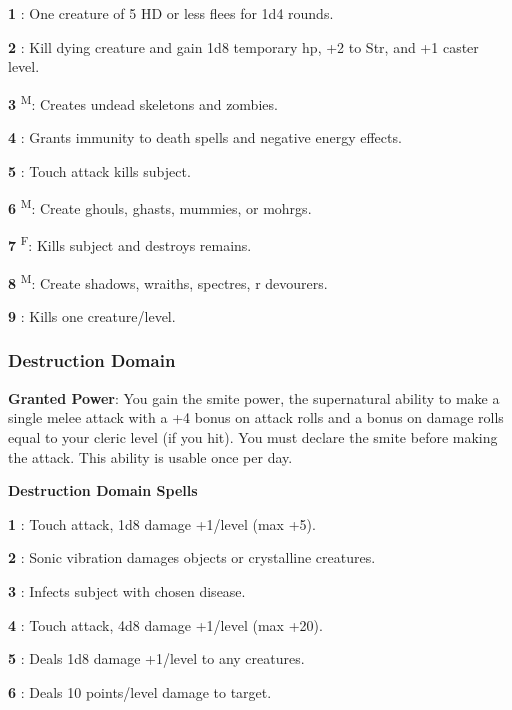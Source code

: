 \textbf{1} : One creature of 5 HD or less flees for 1d4 rounds.

\textbf{2} : Kill dying creature and gain 1d8 temporary hp, +2 to Str, and +1 caster level.

\textbf{3} \textsuperscript{M}: Creates undead skeletons and zombies.

\textbf{4} : Grants immunity to death spells and negative energy effects.

\textbf{5} : Touch attack kills subject.

\textbf{6} \textsuperscript{M}: Create ghouls, ghasts, mummies, or mohrgs.

\textbf{7} \textsuperscript{F}: Kills subject and destroys remains.

\textbf{8} \textsuperscript{M}: Create shadows, wraiths, spectres, r devourers.

\textbf{9} : Kills one creature/level.

\subsubsection{Destruction Domain}

\textbf{Granted Power}: You gain the smite power, the supernatural ability to make a single melee attack with a +4 bonus on attack rolls and a bonus on damage rolls equal to your cleric level (if you hit). You must declare the smite before making the attack. This ability is usable once per day.

\textbf{Destruction Domain Spells}

\textbf{1} : Touch attack, 1d8 damage +1/level (max +5).

\textbf{2} : Sonic vibration damages objects or crystalline creatures.

\textbf{3} : Infects subject with chosen disease.

\textbf{4} : Touch attack, 4d8 damage +1/level (max +20).

\textbf{5} : Deals 1d8 damage +1/level to any creatures.

\textbf{6} : Deals 10 points/level damage to target.

